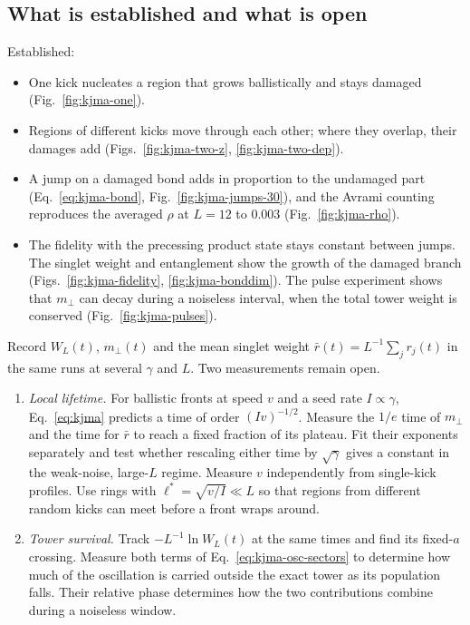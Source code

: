 \subsection{What is established and what is open}
\label{sec:kjma-summary}

Established:
\begin{itemize}
\item One kick nucleates a region that grows ballistically and stays damaged (Fig.~\ref{fig:kjma-one}).
\item Regions of different kicks move through each other; where they overlap, their damages add (Figs.~\ref{fig:kjma-two-z}, \ref{fig:kjma-two-dep}).
\item A jump on a damaged bond adds in proportion to the undamaged part (Eq.~\eqref{eq:kjma-bond}, Fig.~\ref{fig:kjma-jumps-30}), and the Avrami counting reproduces the averaged $\rho$ at $L = 12$ to $0.003$ (Fig.~\ref{fig:kjma-rho}).
\item The fidelity with the precessing product state stays constant between jumps. The singlet weight and entanglement show the growth of the damaged branch (Figs.~\ref{fig:kjma-fidelity}, \ref{fig:kjma-bonddim}). The pulse experiment shows that $m_\perp$ can decay during a noiseless interval, when the total tower weight is conserved (Fig.~\ref{fig:kjma-pulses}).
\end{itemize}
Record $W_L(t)$, $m_\perp(t)$ and the mean singlet weight $\bar r(t)=L^{-1}\sum_j r_j(t)$ in the same runs at several $\gamma$ and $L$. Two measurements remain open.
\begin{enumerate}
\item \emph{Local lifetime.} For ballistic fronts at speed $v$ and a seed rate $I\propto\gamma$, Eq.~\eqref{eq:kjma} predicts a time of order $(Iv)^{-1/2}$. Measure the $1/e$ time of $m_\perp$ and the time for $\bar r$ to reach a fixed fraction of its plateau. Fit their exponents separately and test whether rescaling either time by $\sqrt{\gamma}$ gives a constant in the weak-noise, large-$L$ regime. Measure $v$ independently from single-kick profiles. Use rings with $\ell^*=\sqrt{v/I}\ll L$ so that regions from different random kicks can meet before a front wraps around.
\item \emph{Tower survival.} Track $-L^{-1}\ln W_L(t)$ at the same times and find its fixed-$a$ crossing. Measure both terms of Eq.~\eqref{eq:kjma-osc-sectors} to determine how much of the oscillation is carried outside the exact tower as its population falls. Their relative phase determines how the two contributions combine during a noiseless window.
\end{enumerate}
